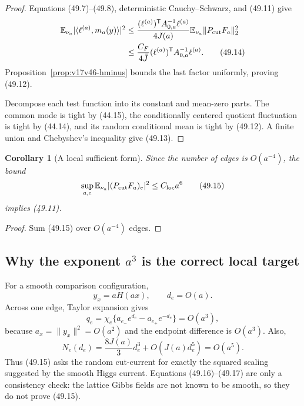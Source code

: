 \documentclass[11pt]{article}
\newtheorem{corollary}[theorem]{Corollary}
\theoremstyle{remark}
\begin{document}
\begin{proof}
Equations (49.7)--(49.8), deterministic Cauchy--Schwarz, and (49.11)
give
\[
\begin{aligned}
 \mathbb E_{\nu_a}
 |\langle\ell^{(a)},m_a(y)\rangle|^2
 &\leq
 \frac{
 (\ell^{(a)})^{\mathsf T}A_{0,a}^{-1}\ell^{(a)}
 }{4J(a)}
 \mathbb E_{\nu_a}\|P_{\rm cut}F_a\|_2^2\\
 &\leq
 \frac{C_F}{4\bar J}
 (\ell^{(a)})^{\mathsf T}A_{0,a}^{-1}\ell^{(a)}.  \tag{49.14}
\end{aligned}
\]
Proposition~\ref{prop:v17v46-hminus} bounds the last factor uniformly,
proving (49.12).

Decompose each test function into its constant and mean-zero parts.
The common mode is tight by (44.15), the conditionally centered
quotient fluctuation is tight by (44.14), and its random conditional
mean is tight by (49.12).  A finite union and Chebyshev's inequality
give (49.13).
\end{proof}

\begin{corollary}[A local sufficient form]
\label{cor:v17v49-local}
Since the number of edges is \(O(a^{-4})\), the bound
\[
 \sup_{a,e}
 \mathbb E_{\nu_a}
 |(P_{\rm cut}F_a)_e|^2
 \leq C_{\rm loc}a^6                               \tag{49.15}
\]
implies (49.11).
\end{corollary}

\begin{proof}
Sum (49.15) over \(O(a^{-4})\) edges.
\end{proof}

\subsection{Why the exponent \(a^3\) is the correct local target}

For a smooth comparison configuration,
\[
 y_x=aH(ax),\qquad d_e=O(a).
\]
Across one edge, Taylor expansion gives
\[
 q_e
 =
 \chi_e\{a_{e_-}e^{d_e}-a_{e_+}e^{-d_e}\}
 =O(a^3),                                         \tag{49.16}
\]
because \(a_x=\|y_x\|^2=O(a^2)\) and the endpoint difference is
\(O(a^3)\).  Also,
\[
 N_e(d_e)
 =
 \frac{8J(a)}3d_e^3+O(J(a)d_e^5)
 =O(a^5).                                         \tag{49.17}
\]
Thus (49.15) asks the random cut-current for exactly the squared
scaling suggested by the smooth Higgs current.  Equations
(49.16)--(49.17) are only a consistency check: the lattice Gibbs
fields are not known to be smooth, so they do not prove (49.15).
\end{document}
